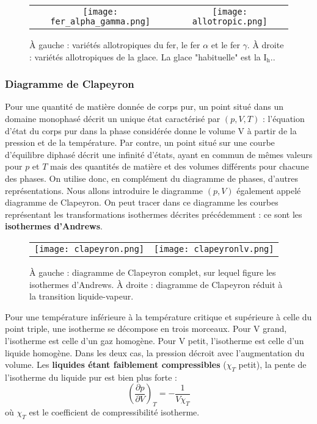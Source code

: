 \documentclass[11pt,a4paper]{report}
\begin{document}
\begin{figure}[h!]
	\begin{center}
		\begin{tabular}{cc}
			\texttt{[image: fer\_alpha\_gamma.png]}&
			\texttt{[image: allotropic.png]}\\
		\end{tabular}
	\end{center}
	\caption{\`A gauche : variétés allotropiques du fer, le fer $\alpha$ et le fer $\gamma$. \`A droite : variétés allotropiques de la glace. La glace "habituelle" est la $\text{I}_\text{h}$..}
\end{figure}

\subsubsection*{Diagramme de Clapeyron}

Pour une quantité de matière donnée de corps pur, un point situé dans un domaine
monophasé décrit un unique état caractérisé par $(p,V,T)$ : l'équation d'état du corps pur dans la phase considérée donne le volume V à partir de la pression et de la température.
Par contre, un point situé sur une courbe d'équilibre diphasé décrit une infinité d'états, ayant en commun de mêmes valeurs pour $p$ et $T$ mais des quantités de matière et des volumes différents pour chacune des phases. On utilise donc, en complément du diagramme de phases, d'autres représentations. Nous allons introduire le diagramme $(p,V)$ également appelé diagramme de Clapeyron. On peut tracer dans ce diagramme les courbes représentant les transformations isothermes décrites précédemment : ce sont les \textbf{isothermes d'Andrews}.

\begin{figure}[h!]
	\begin{center}
		\begin{tabular}{cc}
			\texttt{[image: clapeyron.png]}&
			\texttt{[image: clapeyronlv.png]}\\
		\end{tabular}
	\end{center}
	\caption{\`A gauche : diagramme de Clapeyron complet, sur lequel figure les isothermes 				d'Andrews. \`A droite : diagramme de Clapeyron réduit à la transition liquide-vapeur.}
\end{figure}

Pour une température inférieure à la température critique et supérieure à celle du point triple, une isotherme se décompose en trois morceaux. Pour V grand, l'isotherme est celle d'un gaz homogène. Pour V petit, l'isotherme est celle d'un liquide homogène. Dans les deux cas, la pression décroit avec l'augmentation du volume. Les \textbf{liquides étant faiblement compressibles} ($\chi_T$ petit), la pente de l'isotherme du liquide pur est bien plus forte :
\begin{equation}
	\left(\frac{\partial p}{\partial V}\right)_T = -\frac{1}{V\chi_T}
\end{equation}
où $\chi_T$ est le coefficient de compressibilité isotherme.\\ 
\end{document}
